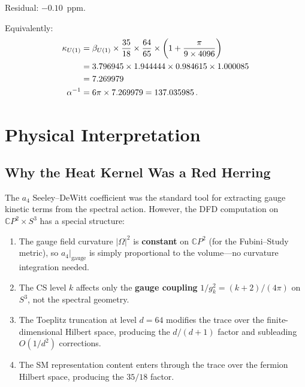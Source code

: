 \documentclass[12pt,a4paper]{article}
\theoremstyle{definition}
\theoremstyle{remark}
\begin{document}
\noindent Residual: $-0.10$~ppm.

Equivalently:
\begin{align}
\kappa_{U(1)} &= \beta_{U(1)} \times \frac{35}{18} \times \frac{64}{65}
  \times \left(1 + \frac{\pi}{9 \times 4096}\right) \notag \\
&= 3.796945 \times 1.944444 \times 0.984615 \times 1.000085 \notag \\
&= 7.269979 \notag \\
\alpha^{-1} &= 6\pi \times 7.269979 = 137.035985\,.
\end{align}

\section{Physical Interpretation}
\label{sec:interpretation}

\subsection{Why the Heat Kernel Was a Red Herring}

The $a_4$ Seeley--DeWitt coefficient was the standard tool for extracting
gauge kinetic terms from the spectral action.  However, the DFD computation
on $\mathbb{C}P^2 \times S^3$ has a special structure:

\begin{enumerate}
\item The gauge field curvature $|\Omega|^2$ is \textbf{constant} on
  $\mathbb{C}P^2$ (for the Fubini--Study metric), so $a_4|_{\mathrm{gauge}}$
  is simply proportional to the volume---no curvature integration needed.

\item The CS level $k$ affects only the \textbf{gauge coupling}
  $1/g_k^2 = (k+2)/(4\pi)$ on $S^3$, not the spectral geometry.

\item The Toeplitz truncation at level $d = 64$ modifies the trace
  over the finite-dimensional Hilbert space, producing the $d/(d+1)$
  factor and subleading $O(1/d^2)$ corrections.

\item The SM representation content enters through the trace over
  the fermion Hilbert space, producing the $35/18$ factor.
\end{enumerate}
\end{document}
